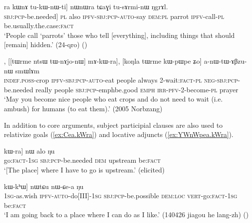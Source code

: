 \begin{exe}
\ex \label{ex:kAnWtsW.kWra}
\gll [kɤ-nɯtsɯ kɯ-ra] ra kɯnɤ tu-kɯ-nɯ-ti] nɯnɯra tɕaɣi tu-sɤrmi-nɯ ŋgrɤl. \\
[[[\textsc{inf}-hide] \textsc{sbj}:\textsc{pcp}-be.needed] \textsc{pl} also \textsc{ipfv}-\textsc{sbj}:\textsc{pcp}-\textsc{auto}-say \textsc{dem}:\textsc{pl} parrot \textsc{ipfv}-call-\textsc{pl} be.usually.the.case:\textsc{fact} \\
\glt `People call `parrots' those who tell [everything], including things that should [remain] hidden.' (24-qro)
()
\end{exe}

\begin{exe}
\ex \label{ex:tWnAjonW.kWra}
, [[tɯrme ntsɯ tɯ-nɤjo-nɯ] mɤ-kɯ-ra], [koŋla tɯrme kɯ-pɯ\redp{}pe ʑo] a-nɯ-tɯ-ɤβzu-nɯ smɯlɤm \\
\textsc{indef}.\textsc{poss}-crop \textsc{ipfv}-\textsc{sbj}:\textsc{pcp}-\textsc{auto}-eat people always 2-wait:\textsc{fact}-\textsc{pl} \textsc{neg}-\textsc{sbj}:\textsc{pcp}-be.needed really people \textsc{sbj}:\textsc{pcp}-emph\redp{}be.good \textsc{emph} \textsc{irr}-\textsc{pfv}-2-become-\textsc{pl} prayer \\
\glt `May you become nice people who eat crops and do not need to wait (i.e. ambush) for humans (to eat them).' (2005 Norbzang)
\end{exe}

In addition to core arguments, subject participial clauses are also used to relativize goals (\ref{ex:Cea.kWra}) and locative adjuncts (\ref{ex:YWnWpea.kWra}).
 
\begin{exe}
\ex \label{ex:Cea.kWra}
\gll [[ɕe-a] kɯ-ra] nɯ alo ŋu \\
go:\textsc{fact}-\textsc{1sg} \textsc{sbj}:\textsc{pcp}-be.needed \textsc{dem} upstream be:\textsc{fact} \\
\glt  `[The place] where I have to go is upstream.' (elicited)
\end{exe}

\begin{exe}
\ex \label{ex:YWnWpea.kWra}
\gll [[aʑo-sɯso ɲɯ-nɯ-pe-a] kɯ-kʰɯ] nɯtɕu nɯ-ɕe-a ŋu \\
\textsc{1sg}-as.wish \textsc{ipfv}-\textsc{auto}-do[III]-\textsc{1sg} \textsc{sbj}:\textsc{pcp}-be.possible \textsc{dem}:\textsc{loc} \textsc{vert}-go:\textsc{fact}-\textsc{1sg} be:\textsc{fact} \\
\glt  `I am going back to a place where I can do as I like.' (140426 jiagou he lang-zh)
()
\end{exe}

